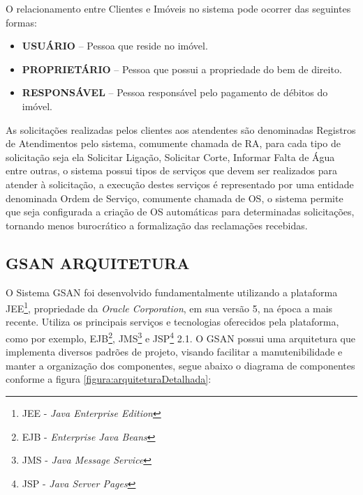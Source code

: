 O relacionamento entre Clientes e Imóveis no sistema pode ocorrer das seguintes formas:
\begin{itemize}
	\item \textbf{USUÁRIO} – Pessoa que reside no imóvel.
	\item \textbf{PROPRIETÁRIO} – Pessoa que possui a propriedade do bem de direito.
	\item \textbf{RESPONSÁVEL} – Pessoa responsável pelo pagamento de débitos do imóvel.	
\end{itemize}

As solicitações realizadas pelos clientes aos atendentes são denominadas Registros de Atendimentos pelo sistema, comumente chamada de RA, para cada tipo de solicitação seja ela Solicitar Ligação, Solicitar Corte, Informar Falta de Água entre outras, o sistema possui tipos de serviços que devem ser realizados para atender à solicitação, a execução destes serviços é representado por uma  entidade denominada Ordem de Serviço, comumente chamada de OS, o sistema permite que seja configurada a criação de OS automáticas para determinadas solicitações, tornando menos burocrático a formalização das reclamações recebidas.


\subsection{\textbf{GSAN ARQUITETURA}}
	
O Sistema GSAN foi desenvolvido fundamentalmente utilizando a plataforma JEE\footnote{JEE - \textit{Java Enterprise Edition}}, propriedade da \textit{Oracle Corporation}, em sua versão 5, na época a mais recente. Utiliza os principais serviços e tecnologias oferecidos pela plataforma, como por exemplo, EJB\footnote{EJB - \textit{Enterprise Java Beans}}, JMS\footnote{JMS - \textit{Java Message Service}} e JSP\footnote{JSP - \textit{Java Server Pages}} 2.1.
O GSAN possui uma arquitetura que implementa diversos padrões de projeto, visando facilitar a manutenibilidade e manter a organização dos componentes, segue abaixo o diagrama de componentes conforme a figura \ref{figura:arquiteturaDetalhada}:

